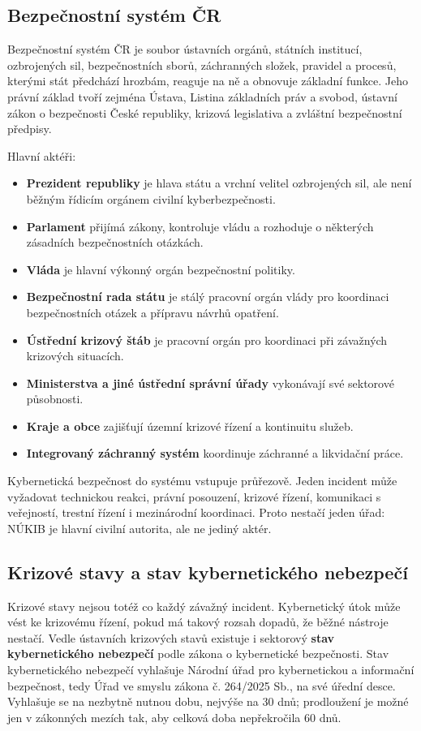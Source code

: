 \subsection*{Bezpečnostní systém ČR}
Bezpečnostní systém ČR je soubor ústavních orgánů, státních institucí, ozbrojených sil, bezpečnostních sborů, záchranných složek, pravidel a procesů, kterými stát předchází hrozbám, reaguje na ně a obnovuje základní funkce. Jeho právní základ tvoří zejména Ústava, Listina základních práv a svobod, ústavní zákon o bezpečnosti České republiky, krizová legislativa a zvláštní bezpečnostní předpisy.

Hlavní aktéři:
\begin{itemize}
  \item \textbf{Prezident republiky} je hlava státu a vrchní velitel ozbrojených sil, ale není běžným řídicím orgánem civilní kyberbezpečnosti.
  \item \textbf{Parlament} přijímá zákony, kontroluje vládu a rozhoduje o některých zásadních bezpečnostních otázkách.
  \item \textbf{Vláda} je hlavní výkonný orgán bezpečnostní politiky.
  \item \textbf{Bezpečnostní rada státu} je stálý pracovní orgán vlády pro koordinaci bezpečnostních otázek a přípravu návrhů opatření.
  \item \textbf{Ústřední krizový štáb} je pracovní orgán pro koordinaci při závažných krizových situacích.
  \item \textbf{Ministerstva a jiné ústřední správní úřady} vykonávají své sektorové působnosti.
  \item \textbf{Kraje a obce} zajišťují územní krizové řízení a kontinuitu služeb.
  \item \textbf{Integrovaný záchranný systém} koordinuje záchranné a likvidační práce.
\end{itemize}

Kybernetická bezpečnost do systému vstupuje průřezově. Jeden incident může vyžadovat technickou reakci, právní posouzení, krizové řízení, komunikaci s veřejností, trestní řízení i mezinárodní koordinaci. Proto nestačí jeden úřad: NÚKIB je hlavní civilní autorita, ale ne jediný aktér.

\subsection*{Krizové stavy a stav kybernetického nebezpečí}
Krizové stavy nejsou totéž co každý závažný incident. Kybernetický útok může vést ke krizovému řízení, pokud má takový rozsah dopadů, že běžné nástroje nestačí. Vedle ústavních krizových stavů existuje i sektorový \textbf{stav kybernetického nebezpečí} podle zákona o kybernetické bezpečnosti. Stav kybernetického nebezpečí vyhlašuje Národní úřad pro kybernetickou a informační bezpečnost, tedy Úřad ve smyslu zákona č. 264/2025 Sb., na své úřední desce. Vyhlašuje se na nezbytně nutnou dobu, nejvýše na 30 dnů; prodloužení je možné jen v zákonných mezích tak, aby celková doba nepřekročila 60 dnů.

